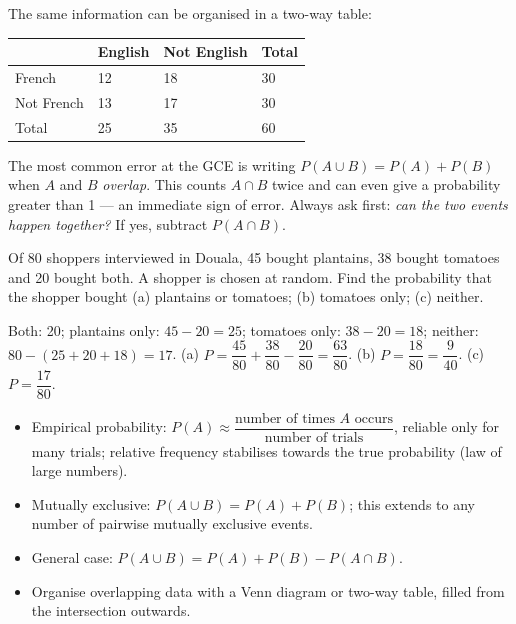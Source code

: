 \documentclass[11pt]{article}
\newcommand{\cle}[1]{{\popxbold\color{popdark}#1}}
\begin{document}
The same information can be organised in a \cle{two-way table}:

\begin{center}
\begin{tabularx}{\linewidth}{|l|X|X|X|}
\hline
\rowcolor{popblueL} & English & Not English & Total \\
\hline
French & 12 & 18 & 30 \\
\hline
Not French & 13 & 17 & 30 \\
\hline
Total & 25 & 35 & 60 \\
\hline
\end{tabularx}
\end{center}

\begin{attention}
The most common error at the GCE is writing $P(A\cup B)=P(A)+P(B)$ when $A$ and $B$ \emph{overlap}. This counts $A\cap B$ twice and can even give a probability greater than 1 — an immediate sign of error. Always ask first: \emph{can the two events happen together?} If yes, subtract $P(A\cap B)$.
\end{attention}

\begin{exercice}
Of 80 shoppers interviewed in Douala, 45 bought plantains, 38 bought tomatoes and 20 bought both. A shopper is chosen at random. Find the probability that the shopper bought (a) plantains or tomatoes; (b) tomatoes only; (c) neither.
\end{exercice}

\begin{corrige}[Exercise 1]
Both: 20; plantains only: $45-20=25$; tomatoes only: $38-20=18$; neither: $80-(25+20+18)=17$.
(a) $P=\dfrac{45}{80}+\dfrac{38}{80}-\dfrac{20}{80}=\dfrac{63}{80}$. \quad (b) $P=\dfrac{18}{80}=\dfrac{9}{40}$. \quad (c) $P=\dfrac{17}{80}$.
\end{corrige}

\begin{aretenir}
\begin{itemize}
\item Empirical probability: $P(A)\approx \dfrac{\text{number of times }A\text{ occurs}}{\text{number of trials}}$, reliable only for many trials; relative frequency stabilises towards the true probability (law of large numbers).
\item Mutually exclusive: $P(A\cup B)=P(A)+P(B)$; this extends to any number of pairwise mutually exclusive events.
\item General case: $P(A\cup B)=P(A)+P(B)-P(A\cap B)$.
\item Organise overlapping data with a Venn diagram or two-way table, filled from the intersection outwards.
\end{itemize}
\end{aretenir}
\end{document}
